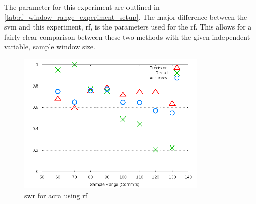 The parameter for this experiment are outlined in \autoref{tab:rf_window_range_experiment_setup}. The major difference between the \gls{svm} and this experiment, \gls{rf}, is the parameters used for the \gls{rf}. This allows for a fairly clear comparison between these two methods with the given independent variable, sample window size.



\begin{figure}[!t]
    \centering
        \includegraphics[width=0.8\textwidth]{images/rf/test_1/acra_sample_range}
        \caption{\gls{swr} for acra using \gls{rf}}
        \label{fig:test_1_acra_rf}
\end{figure}

